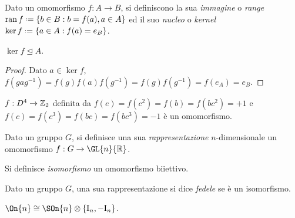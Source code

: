 \begin{definition}
	Dato un omomorfismo $ f : A \rightarrow B $, si definiscono la sua \textit{immagine} o \textit{range} $ \ran f \defeq \{b \in B : b = f(a), a \in A\} $ ed il suo \textit{nucleo} o \textit{kernel} $ \ker f \defeq \{a \in A : f(a) = e_B\} $.
\end{definition}

\begin{proposition}
	$ \ker f \trianglelefteq A $.
\end{proposition}
\begin{proof}
	Dato $ a \in \ker f $, $ f(gag^{-1}) = f(g) f(a) f(g^{-1}) = f(g) f(g^{-1}) = f(e_A) = e_B $.
\end{proof}

\begin{example}
	$ f : D^4 \rightarrow \mathbb{Z}_2 $ definita da $ f(e) = f(c^2) = f(b) = f(bc^2) = +1 $ e $ f(c) = f(c^3) = f(bc) = f(bc^3) = -1 $ è un omomorfismo.
\end{example}

\begin{definition}
	Dato un gruppo $ G $, si definisce una sua \textit{rappresentazione} $ n $-dimensionale un omomorfismo $ f : G \rightarrow \GL{n}{\R} $.
\end{definition}

\begin{definition}
	Si definisce \textit{isomorfismo} un omomorfismo biiettivo.
\end{definition}

\begin{definition}
	Dato un gruppo $ G $, una sua rappresentazione si dice \textit{fedele} se è un isomorfismo.
\end{definition}

\begin{example}
	$ \On{n} \cong \SOn{n} \otimes \{\tens{I}_n, -\tens{I}_n\} $.
\end{example}










